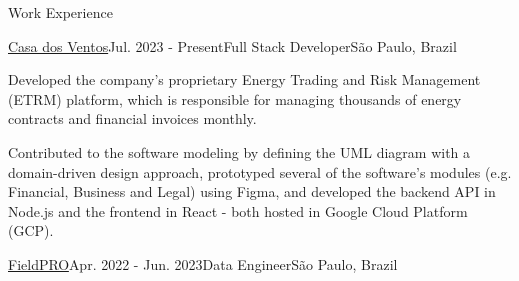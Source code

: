 \documentclass{resume} %
\begin{document}
\vspace{-0.2cm}
\begin{rSection}{Work Experience}

\begin{rSubsection}{\href{https://casadosventos.com.br/}{Casa dos Ventos}}{Jul. 2023 - Present}{Full Stack Developer}{São Paulo, Brazil}
\item Developed the company's proprietary Energy Trading and Risk Management (ETRM) platform, which is responsible for managing thousands of energy contracts and financial invoices monthly.
\item Contributed to the software modeling by defining the UML diagram with a domain-driven design approach, prototyped several of the software's modules (e.g. Financial, Business and Legal) using Figma, and developed the backend API in Node.js and the frontend in React - both hosted in Google Cloud Platform (GCP).
\end{rSubsection}

\begin{rSubsection}{\href{https://fieldpro.com.br/}{FieldPRO}}{Apr. 2022 - Jun. 2023}{Data Engineer}{São Paulo, Brazil}




\end{rSubsection}
\end{rSection}
\end{document}

